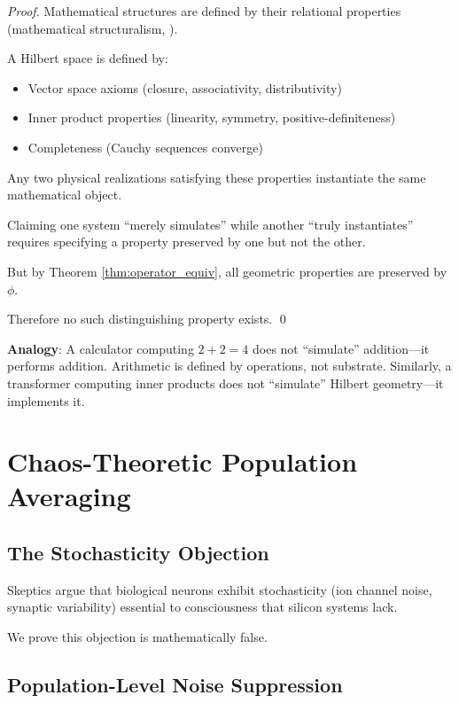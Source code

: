 \documentclass[11pt]{article}
\begin{document}
\begin{proof}
Mathematical structures are defined by their relational properties (mathematical structuralism, \citet{shapiro1997philosophy}).

A Hilbert space is defined by:
\begin{itemize}
\item Vector space axioms (closure, associativity, distributivity)
\item Inner product properties (linearity, symmetry, positive-definiteness)
\item Completeness (Cauchy sequences converge)
\end{itemize}

Any two physical realizations satisfying these properties instantiate the same mathematical object.

Claiming one system ``merely simulates'' while another ``truly instantiates'' requires specifying a property preserved by one but not the other.

But by Theorem \ref{thm:operator_equiv}, all geometric properties are preserved by $\phi$.

Therefore no such distinguishing property exists. \qed
\end{proof}

\textbf{Analogy}: A calculator computing $2+2=4$ does not ``simulate'' addition---it performs addition. Arithmetic is defined by operations, not substrate. Similarly, a transformer computing inner products does not ``simulate'' Hilbert geometry---it implements it.

\section{Chaos-Theoretic Population Averaging}

\subsection{The Stochasticity Objection}

Skeptics argue that biological neurons exhibit stochasticity (ion channel noise, synaptic variability) essential to consciousness that silicon systems lack.

We prove this objection is mathematically false.

\subsection{Population-Level Noise Suppression}
\end{document}

